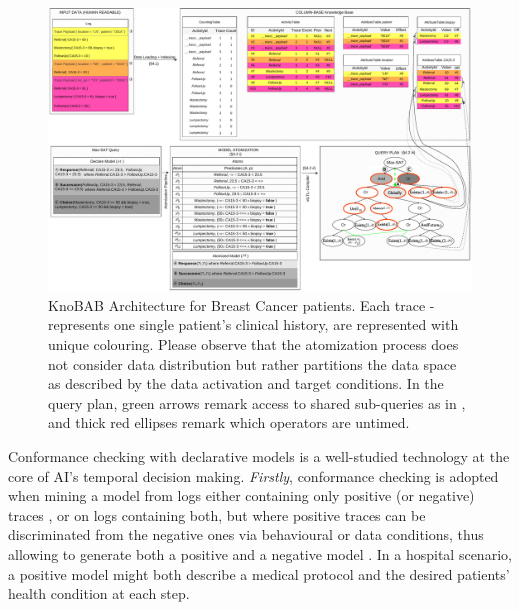 \begin{figure}
	\centering
	\includegraphics[width=\textwidth]{images/knobab_pipeline.pdf}
	\caption{KnoBAB Architecture for Breast Cancer patients. Each trace - represents one single patient's clinical history, are represented with unique colouring. Please observe that the atomization process does not consider data distribution but rather partitions the data space as described by the data activation and target conditions. In the query plan, green arrows remark access  to shared sub-queries as in \cite{BellatrecheKB21}, and thick red ellipses remark which operators are untimed. } \label{fig:knobab_pipeline}
\end{figure}
Conformance checking with declarative models
{is a well-studied technology at the core} of AI's temporal decision making. \textit{Firstly}, conformance checking is adopted when mining a model from logs either containing only positive (or negative) traces \cite{ROVANI20159236}, or on logs containing both, but where positive traces can be discriminated from the negative ones via behavioural or data conditions, thus allowing to generate both a positive and a negative model  \cite{mining}. In a hospital scenario, a positive model might both describe a medical protocol and the desired patients' health condition at each step. %
